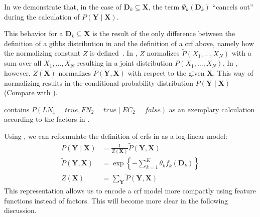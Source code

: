 In  we demonstrate that, in the case of $\mathbf{D}_k\subseteq \mathbf{X}$, the term $\Psi_k(\mathbf{D}_k)$ ``cancels out'' during the calculation of $P(\mathbf{Y}\mid\mathbf{X})$.

This behavior for a $\mathbf{D}_k\subseteq\mathbf{X}$ is the result of the only difference between the definition of a \gls{gibbs distribution} in  and the definition of a \gls{crf} above, namely how the normalizing constant $Z$ is defined~\citep{koller2009probabilistic}.
In , $Z$ normalizes $\tilde{P}(X_1,\dots,X_N)$ with a sum over all $X_1,\dots,X_N$ resulting in a \gls{joint distribution} $P(X_1,\dots,X_N)$.
In , however, $Z(\mathbf{X})$ normalizes $\tilde{P}(\mathbf{Y},\mathbf{X})$ with respect to the given $\mathbf{X}$.
This way of normalizing results in the \gls{conditional probability distribution} $P(\mathbf{Y}\mid\mathbf{X})$ (Compare with ).

 contains $P(LN_1{=}true,FN_2{=}true\mid EC_2{=}false)$ as an exemplary calculation according to the \glspl{factor} in .

\bigskip

Using , we can reformulate the definition of \glspl{crf} in  as a \gls{log-linear model}:
\begin{equation}
  \label{equ:crf-log-linear}
  \begin{split}
    P(\mathbf{Y}\mid\mathbf{X}) & = \frac{1}{Z(\mathbf{X})}\tilde{P}(\mathbf{Y},\mathbf{X}) \\
    \tilde{P}(\mathbf{Y},\mathbf{X}) & = \exp\left\{ -\sum_{k=1}^K \theta_k f_k\left(\mathbf{D}_k\right)\right\} \\
    Z(\mathbf{X}) & = \sum_{\mathbf{Y}}\tilde{P}(\mathbf{Y},\mathbf{X})
  \end{split}
\end{equation}
This representation allows us to encode a \gls{crf} model more compactly using \glspl{feature function} instead of \glspl{factor}.
This will become more clear in the following discussion.

\bigskip

